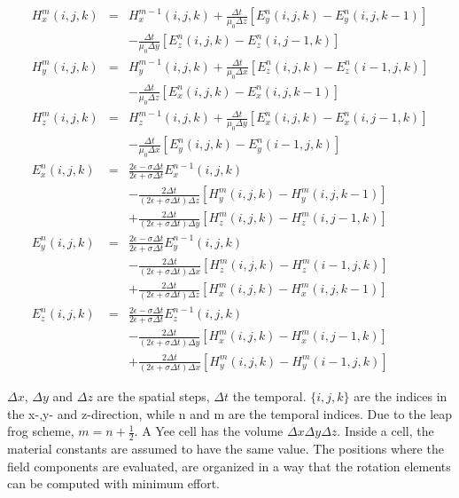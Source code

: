 \documentclass[a4paper,11pt]{report}
\begin{document}
\begin{eqnarray}
H_x^m(i,j,k)&=&	H_x^{m-1}(i,j,k) + \frac{\Delta t}{\mu_0 \Delta z}[ E_y^{n}(i,j,k)-E_y^{n}(i,j,k-1)]	\nonumber \\
&& -  \frac{\Delta t}{\mu_0 \Delta y}[ E_z^{n}(i,j,k)-E_z^{n}(i,j-1,k)]	\\
H_y^m(i,j,k)&=&	H_y^{m-1}(i,j,k) + \frac{\Delta t}{\mu_0 \Delta x}[E_z^{n}(i,j,k)-E_z^{n}(i-1,j,k)]	\nonumber \\
&& -  \frac{\Delta t}{\mu_0 \Delta z}[ E_x^{n}(i,j,k)-E_x^{n}(i,j,k-1)]	\\
H_z^m(i,j,k)&=&	H_z^{m-1}(i,j,k) + \frac{\Delta t}{\mu_0 \Delta y}[E_x^{n}(i,j,k)-E_x^{n}(i,j-1,k)]	\nonumber \\
&& - \frac{\Delta t}{\mu_0 \Delta x}[ E_y^{n}(i,j,k)-E_y^{n}(i-1,j,k)]	\\
E_x^n(i,j,k)&=&	\frac{2\epsilon-\sigma \Delta t}{2\epsilon+\sigma \Delta t} E_x^{n-1}(i,j,k) 	\\
&& - \frac{2\Delta t}{(2\epsilon+\sigma \Delta t)\Delta z} [H_y^m(i,j,k) - H_y^m(i,j,k-1)]	\nonumber \\
&& + \frac{2\Delta t}{(2\epsilon+\sigma \Delta t)\Delta y} [H_z^m(i,j,k) - H_z^m(i,j-1,k)]	\\
E_y^n(i,j,k)&=&	\frac{2\epsilon-\sigma \Delta t}{2\epsilon+\sigma \Delta t} E_y^{n-1}(i,j,k) 	\\
&& - \frac{2\Delta t}{(2\epsilon+\sigma \Delta t)\Delta x} [H_z^m(i,j,k) - H_z^m(i-1,j,k)]	\nonumber \\
&& + \frac{2\Delta t}{(2\epsilon+\sigma \Delta t)\Delta z} [H_x^m(i,j,k) - H_x^m(i,j,k-1)]	\\
E_z^n(i,j,k)&=&	\frac{2\epsilon-\sigma \Delta t}{2\epsilon+\sigma \Delta t} E_z^{n-1}(i,j,k) 	\\
&& - \frac{2\Delta t}{(2\epsilon+\sigma \Delta t)\Delta y} [H_x^m(i,j,k) - H_x^m(i,j-1,k)]	\nonumber \\
&& + \frac{2\Delta t}{(2\epsilon+\sigma \Delta t)\Delta x} [H_y^m(i,j,k) - H_y^m(i-1,j,k)]	
\end{eqnarray}

$\Delta x$, $\Delta y$ and $\Delta z$ are the spatial steps, $\Delta t$ the temporal. $\{i,j,k\}$ are the indices in the x-,y- and z-direction, while n and m are the temporal indices. Due to the leap frog scheme, $m=n+\frac{1}{2}$. A Yee cell has the volume $\Delta x \Delta y \Delta z$. Inside a cell, the material constants are assumed to have the same value. The positions where the field components are evaluated, are organized in a way that the rotation elements can be computed with minimum effort.\\
\end{document}
